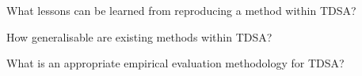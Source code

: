 

\begin{researchq}
What lessons can be learned from reproducing a method within TDSA? 
\label{rq:lessons}
\end{researchq}

\begin{researchq}
How generalisable are existing methods within TDSA?
\label{rq:generalisable}
\end{researchq}

\begin{researchq}
What is an appropriate empirical evaluation methodology for TDSA?
\label{rq:measured}
\end{researchq}

